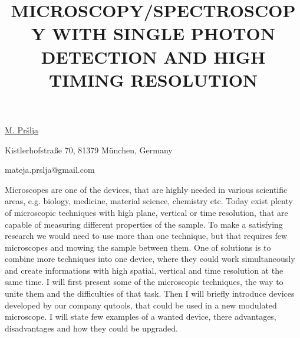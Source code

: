 \title{MICROSCOPY/SPECTROSCOPY WITH SINGLE PHOTON DETECTION AND HIGH TIMING RESOLUTION}

\underline{M.  Pršlja}  

{\normalsize{\vspace{-4mm}
Kistlerhofstraße 70, 81379 München, Germany



\email mateja.prslja@gmail.com}}

Microscopes are one of the devices, that are highly needed in various scientific areas, e.g. biology, medicine, material science, chemistry etc. Today exist plenty of microscopic techniques with high plane, vertical or time resolution, that are capable of measuring different properties of the sample. To make a satisfying research we would need to use more than one technique, but that requires few microscopes and mowing the sample between them. One of solutions is to combine more techniques into one device, where they could work simultaneously and create informations with high spatial, vertical and time resolution at the same time. I will first present some of the microscopic techniques, the way to unite them and the difficulties of that task. Then I will briefly introduce devices developed by our company qutools, that could be used in a new modulated microscope. I will state few examples of a wanted device, there advantages, disadvantages and how they could be upgraded.   

\vspace{\baselineskip}